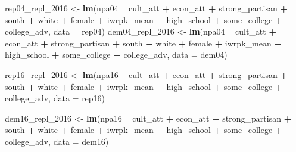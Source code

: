 \documentclass[
]{article}
\newenvironment{Shaded}{\begin{snugshade}}{\end{snugshade}}
\newcommand{\DataTypeTok}[1]{\textcolor[rgb]{0.13,0.29,0.53}{#1}}
\newcommand{\DecValTok}[1]{\textcolor[rgb]{0.00,0.00,0.81}{#1}}
\newcommand{\KeywordTok}[1]{\textcolor[rgb]{0.13,0.29,0.53}{\textbf{#1}}}
\newcommand{\NormalTok}[1]{#1}
\newcommand{\OperatorTok}[1]{\textcolor[rgb]{0.81,0.36,0.00}{\textbf{#1}}}
\newcommand{\StringTok}[1]{\textcolor[rgb]{0.31,0.60,0.02}{#1}}
\begin{document}
\begin{Shaded}
\begin{Highlighting}[]
\NormalTok{rep04_repl_}\DecValTok{2016}\NormalTok{ <-}\StringTok{ }\KeywordTok{lm}\NormalTok{(npa04 }\OperatorTok{~}\StringTok{ }\NormalTok{cult_att }\OperatorTok{+}\StringTok{ }\NormalTok{econ_att }\OperatorTok{+}\StringTok{ }\NormalTok{strong_partisan }\OperatorTok{+}\StringTok{  }
\StringTok{                                            }\NormalTok{south }\OperatorTok{+}\StringTok{ }\NormalTok{white }\OperatorTok{+}\StringTok{  }\NormalTok{female }\OperatorTok{+}
\StringTok{                                            }\NormalTok{iwrpk_mean }\OperatorTok{+}
\StringTok{                                            }\NormalTok{high_school }\OperatorTok{+}\StringTok{ }\NormalTok{some_college }\OperatorTok{+}\StringTok{ }\NormalTok{college_adv, }\DataTypeTok{data =}\NormalTok{ rep04)}
\NormalTok{dem04_repl_}\DecValTok{2016}\NormalTok{ <-}\StringTok{ }\KeywordTok{lm}\NormalTok{(npa04 }\OperatorTok{~}\StringTok{ }\NormalTok{cult_att }\OperatorTok{+}\StringTok{ }\NormalTok{econ_att }\OperatorTok{+}\StringTok{ }\NormalTok{strong_partisan }\OperatorTok{+}\StringTok{  }
\StringTok{                                            }\NormalTok{south }\OperatorTok{+}\StringTok{ }\NormalTok{white }\OperatorTok{+}\StringTok{ }\NormalTok{female }\OperatorTok{+}
\StringTok{                                            }\NormalTok{iwrpk_mean }\OperatorTok{+}
\StringTok{                                            }\NormalTok{high_school }\OperatorTok{+}\StringTok{ }\NormalTok{some_college }\OperatorTok{+}\StringTok{ }\NormalTok{college_adv, }\DataTypeTok{data =}\NormalTok{ dem04)}

\NormalTok{rep16_repl_}\DecValTok{2016}\NormalTok{ <-}\StringTok{ }\KeywordTok{lm}\NormalTok{(npa16 }\OperatorTok{~}\StringTok{ }\NormalTok{cult_att }\OperatorTok{+}\StringTok{ }\NormalTok{econ_att }\OperatorTok{+}\StringTok{ }\NormalTok{strong_partisan }\OperatorTok{+}\StringTok{ }
\StringTok{                                            }\NormalTok{south }\OperatorTok{+}\StringTok{ }\NormalTok{white }\OperatorTok{+}\StringTok{ }\NormalTok{female }\OperatorTok{+}
\StringTok{                                            }\NormalTok{iwrpk_mean }\OperatorTok{+}
\StringTok{                                            }\NormalTok{high_school }\OperatorTok{+}\StringTok{ }\NormalTok{some_college }\OperatorTok{+}\StringTok{ }\NormalTok{college_adv, }\DataTypeTok{data =}\NormalTok{ rep16)}

\NormalTok{dem16_repl_}\DecValTok{2016}\NormalTok{ <-}\StringTok{ }\KeywordTok{lm}\NormalTok{(npa16 }\OperatorTok{~}\StringTok{ }\NormalTok{cult_att }\OperatorTok{+}\StringTok{ }\NormalTok{econ_att }\OperatorTok{+}\StringTok{ }\NormalTok{strong_partisan }\OperatorTok{+}\StringTok{ }
\StringTok{                                            }\NormalTok{south }\OperatorTok{+}\StringTok{ }\NormalTok{white }\OperatorTok{+}\StringTok{ }\NormalTok{female }\OperatorTok{+}
\StringTok{                                            }\NormalTok{iwrpk_mean }\OperatorTok{+}
\StringTok{                                            }\NormalTok{high_school }\OperatorTok{+}\StringTok{ }\NormalTok{some_college }\OperatorTok{+}\StringTok{ }\NormalTok{college_adv, }\DataTypeTok{data =}\NormalTok{ dem16)}


\end{Highlighting}
\end{Shaded}
\end{document}
